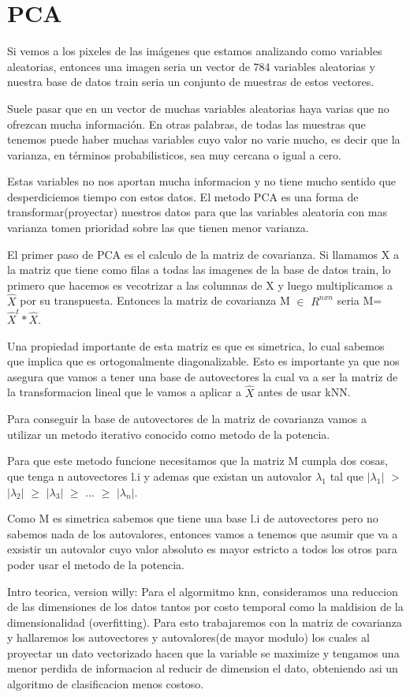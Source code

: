 \section{PCA}
Si vemos a los pixeles de las imágenes que estamos analizando como variables aleatorias, entonces una imagen seria un vector de 784 variables aleatorias y nuestra base de datos train seria un conjunto de muestras de estos vectores. \par
\indent Suele pasar que en un vector de muchas variables aleatorias haya varias que no ofrezcan mucha información. En otras palabras, de todas las muestras que tenemos puede haber muchas variables cuyo valor no varie mucho, es decir que la varianza, en términos probabilisticos, sea muy cercana o igual a cero. \par
\indent Estas variables no nos aportan mucha informacion y no tiene mucho sentido que desperdiciemos tiempo con estos datos. El metodo PCA es una forma de transformar(proyectar) nuestros datos para que las variables aleatoria con mas varianza tomen prioridad sobre las que tienen menor varianza.\par
\indent El primer paso de PCA es el calculo de la matriz de covarianza. Si llamamos X a la matriz que tiene como filas a todas las imagenes de la base de datos train, lo primero que hacemos es vecotrizar a las columnas de X y luego multiplicamos a $\hat{X}$ por su transpuesta. Entonces la matriz de covarianza M $\in$ $R^{nxn}$  seria M=$\hat{X}^{t}*\hat{X}$. \par
\indent Una propiedad importante de esta matriz es que es simetrica, lo cual sabemos que implica que es ortogonalmente diagonalizable. Esto es importante ya que nos asegura que vamos a tener una base de autovectores la cual va a ser la matriz de la transformacion lineal que le vamos a aplicar a $\hat{X}$ antes de usar kNN. \par
\indent Para conseguir la base de autovectores de la matriz de covarianza vamos a utilizar un metodo iterativo conocido como metodo de la potencia. \par
\indent Para que este metodo funcione necesitamos que la matriz M cumpla dos cosas, que tenga n autovectores l.i y ademas que existan un autovalor $\lambda_1$ tal que $|\lambda_1|$ $>$ $|\lambda_2|$ $\geq$ $|\lambda_3|$ $\geq$ ... $\geq$ $|\lambda_n|$. \par
\indent Como M es simetrica sabemos que tiene una base l.i de autovectores pero no sabemos nada de los autovalores, entonces vamos a tenemos que asumir que va a exsistir un autovalor cuyo valor absoluto es mayor estricto a todos los otros para poder usar el metodo de la potencia.\par
\break
Intro teorica, version willy:
Para el algormitmo knn, consideramos una reduccion de las dimensiones de los datos tantos por costo temporal como la maldision de la dimensionalidad (overfitting). Para esto trabajaremos con la matriz de covarianza y hallaremos los autovectores y autovalores(de mayor modulo) los cuales al proyectar un dato vectorizado hacen que la variable se maximize y tengamos una menor perdida de informacion al reducir de dimension el dato, obteniendo asi un algoritmo de clasificacion menos costoso.
